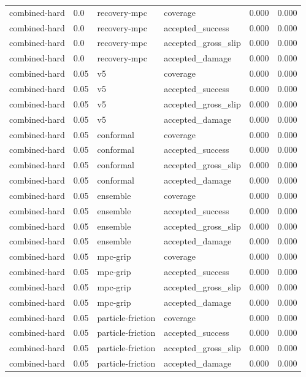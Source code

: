 \documentclass{article}
\begin{document}
\begin{longtable}{@{}ll llrr@{}}
combined-hard & 0.0 & recovery-mpc & coverage & 0.000 & 0.000 \\
combined-hard & 0.0 & recovery-mpc & accepted\_success & 0.000 & 0.000 \\
combined-hard & 0.0 & recovery-mpc & accepted\_gross\_slip & 0.000 & 0.000 \\
combined-hard & 0.0 & recovery-mpc & accepted\_damage & 0.000 & 0.000 \\
combined-hard & 0.05 & v5 & coverage & 0.000 & 0.000 \\
combined-hard & 0.05 & v5 & accepted\_success & 0.000 & 0.000 \\
combined-hard & 0.05 & v5 & accepted\_gross\_slip & 0.000 & 0.000 \\
combined-hard & 0.05 & v5 & accepted\_damage & 0.000 & 0.000 \\
combined-hard & 0.05 & conformal & coverage & 0.000 & 0.000 \\
combined-hard & 0.05 & conformal & accepted\_success & 0.000 & 0.000 \\
combined-hard & 0.05 & conformal & accepted\_gross\_slip & 0.000 & 0.000 \\
combined-hard & 0.05 & conformal & accepted\_damage & 0.000 & 0.000 \\
combined-hard & 0.05 & ensemble & coverage & 0.000 & 0.000 \\
combined-hard & 0.05 & ensemble & accepted\_success & 0.000 & 0.000 \\
combined-hard & 0.05 & ensemble & accepted\_gross\_slip & 0.000 & 0.000 \\
combined-hard & 0.05 & ensemble & accepted\_damage & 0.000 & 0.000 \\
combined-hard & 0.05 & mpc-grip & coverage & 0.000 & 0.000 \\
combined-hard & 0.05 & mpc-grip & accepted\_success & 0.000 & 0.000 \\
combined-hard & 0.05 & mpc-grip & accepted\_gross\_slip & 0.000 & 0.000 \\
combined-hard & 0.05 & mpc-grip & accepted\_damage & 0.000 & 0.000 \\
combined-hard & 0.05 & particle-friction & coverage & 0.000 & 0.000 \\
combined-hard & 0.05 & particle-friction & accepted\_success & 0.000 & 0.000 \\
combined-hard & 0.05 & particle-friction & accepted\_gross\_slip & 0.000 & 0.000 \\
combined-hard & 0.05 & particle-friction & accepted\_damage & 0.000 & 0.000 \\

\end{longtable}
\end{document}
